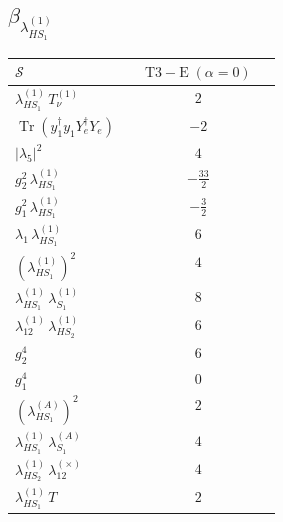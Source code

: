 \documentclass[9pt]{article}
\begin{document}
\subsection*{$ \beta_{\lambda_{HS_1}^{(1)}} $}
\begin{longtable}{@{}p{0.31\linewidth}c@{}}
\toprule
$\mathcal{S}$ & $ \mathrm{T3-E}\;(\alpha=0) $ \\
\midrule
$ \lambda_{HS_1}^{(1)}\,T_{\nu}^{(1)} $ & $ 2 $ \\
$ \operatorname{Tr}(y_1^\dagger y_1Y_e^\dagger Y_e) $ & $ -2 $ \\
$ |\lambda_5|^2 $ & $ 4 $ \\
$ g_2^2\,\lambda_{HS_1}^{(1)} $ & $ - \frac{33}{2} $ \\
$ g_1^2\,\lambda_{HS_1}^{(1)} $ & $ - \frac{3}{2} $ \\
$ \lambda_1\,\lambda_{HS_1}^{(1)} $ & $ 6 $ \\
$ \left(\lambda_{HS_1}^{(1)}\right)^2 $ & $ 4 $ \\
$ \lambda_{HS_1}^{(1)}\,\lambda_{S_1}^{(1)} $ & $ 8 $ \\
$ \lambda_{12}^{(1)}\,\lambda_{HS_2}^{(1)} $ & $ 6 $ \\
$ g_2^4 $ & $ 6 $ \\
$ g_1^4 $ & $ 0 $ \\
$ \left(\lambda_{HS_1}^{(A)}\right)^2 $ & $ 2 $ \\
$ \lambda_{HS_1}^{(1)}\,\lambda_{S_1}^{(A)} $ & $ 4 $ \\
$ \lambda_{HS_2}^{(1)}\,\lambda_{12}^{(\times)} $ & $ 4 $ \\
$ \lambda_{HS_1}^{(1)}\,T $ & $ 2 $ \\
\bottomrule
\end{longtable}
\end{document}
